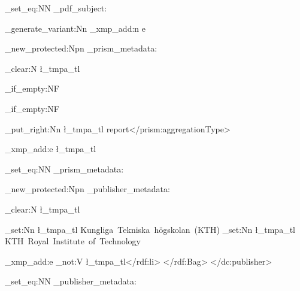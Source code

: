 \cs_set_eq:NN \buildPdfSubject \build_pdf_subject:
\makeatother
\ExplSyntaxOff

\ExplSyntaxOn
\makeatletter
\cs_generate_variant:Nn \pdfmeta_xmp_add:n { e }

\cs_new_protected:Npn \inject_prism_metadata: {
  \tl_clear:N \l_tmpa_tl

  \tl_if_empty:NF 

  \tl_if_empty:NF 

  \tl_put_right:Nn \l_tmpa_tl {
    \space\space\space{}report</prism:aggregationType>^^J
  }

  \pdfmeta_xmp_add:e { \l_tmpa_tl }
}

\cs_set_eq:NN \injectPrismMetadata \inject_prism_metadata:
\makeatother
\ExplSyntaxOff

\ExplSyntaxOn
\makeatletter
\cs_new_protected:Npn \inject_publisher_metadata: {
  \tl_clear:N \l_tmpa_tl

  \ifinswedish
    \tl_set:Nn \l_tmpa_tl { Kungliga~Tekniska~högskolan~(KTH) }
  \else
    \tl_set:Nn \l_tmpa_tl { KTH~Royal~Institute~of~Technology }
  \fi

  \pdfmeta_xmp_add:e {
    \space\space\space{}^^J
    \space\space\space\space\space{}^^J
    \space\space\space\space\space\space\space{}\exp_not:V \l_tmpa_tl</rdf:li>^^J
    \space\space\space\space\space\space</rdf:Bag>^^J
    \space\space\space\space</dc:publisher>^^J
  }
}

\cs_set_eq:NN \injectPublisherMetadata \inject_publisher_metadata:
\makeatother
\ExplSyntaxOff

\buildTaggedKeywords
\buildPdfSubject
\injectPrismMetadata
\injectPublisherMetadata
